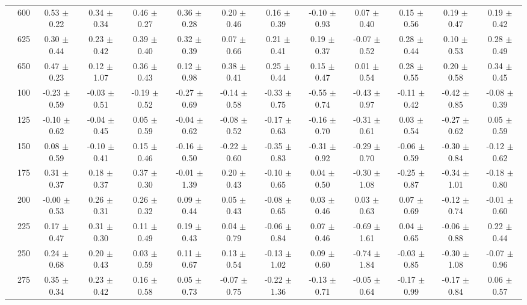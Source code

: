\begin{table}[h]
{\begin{tabular}{
        ccccccccccccc}
 & 600& 0.53 $\pm$ 0.22& 0.34 $\pm$ 0.34& 0.46 $\pm$ 0.27& 0.36 $\pm$ 0.28& 0.20 $\pm$ 0.46& 0.16 $\pm$ 0.39& -0.10 $\pm$ 0.93& 0.07 $\pm$ 0.40& 0.15 $\pm$ 0.56& 0.19 $\pm$ 0.47& 0.19 $\pm$ 0.42 \\ 
 & 625& 0.30 $\pm$ 0.44& 0.23 $\pm$ 0.42& 0.39 $\pm$ 0.40& 0.32 $\pm$ 0.39& 0.07 $\pm$ 0.66& 0.21 $\pm$ 0.41& 0.19 $\pm$ 0.37& -0.07 $\pm$ 0.52& 0.28 $\pm$ 0.44& 0.10 $\pm$ 0.53& 0.28 $\pm$ 0.49 \\ 
 & 650& 0.47 $\pm$ 0.23& 0.12 $\pm$ 1.07& 0.36 $\pm$ 0.43& 0.12 $\pm$ 0.98& 0.38 $\pm$ 0.41& 0.25 $\pm$ 0.44& 0.15 $\pm$ 0.47& 0.01 $\pm$ 0.54& 0.28 $\pm$ 0.55& 0.20 $\pm$ 0.58& 0.34 $\pm$ 0.45 \\ \hline 
 & 100& -0.23 $\pm$ 0.59& -0.03 $\pm$ 0.51& -0.19 $\pm$ 0.52& -0.27 $\pm$ 0.69& -0.14 $\pm$ 0.58& -0.33 $\pm$ 0.75& -0.55 $\pm$ 0.74& -0.43 $\pm$ 0.97& -0.11 $\pm$ 0.42& -0.42 $\pm$ 0.85& -0.08 $\pm$ 0.39 \\ 
 & 125& -0.10 $\pm$ 0.62& -0.04 $\pm$ 0.45& 0.05 $\pm$ 0.59& -0.04 $\pm$ 0.62& -0.08 $\pm$ 0.52& -0.17 $\pm$ 0.63& -0.16 $\pm$ 0.70& -0.31 $\pm$ 0.61& 0.03 $\pm$ 0.54& -0.27 $\pm$ 0.62& 0.05 $\pm$ 0.59 \\ 
 & 150& 0.08 $\pm$ 0.59& -0.10 $\pm$ 0.41& 0.15 $\pm$ 0.46& -0.16 $\pm$ 0.50& -0.22 $\pm$ 0.60& -0.35 $\pm$ 0.83& -0.31 $\pm$ 0.92& -0.29 $\pm$ 0.70& -0.06 $\pm$ 0.59& -0.30 $\pm$ 0.84& -0.12 $\pm$ 0.62 \\ 
 & 175& 0.31 $\pm$ 0.37& 0.18 $\pm$ 0.37& 0.37 $\pm$ 0.30& -0.01 $\pm$ 1.39& 0.20 $\pm$ 0.43& -0.10 $\pm$ 0.65& 0.04 $\pm$ 0.50& -0.30 $\pm$ 1.08& -0.25 $\pm$ 0.87& -0.34 $\pm$ 1.01& -0.18 $\pm$ 0.80 \\ 
 & 200& -0.00 $\pm$ 0.53& 0.26 $\pm$ 0.31& 0.26 $\pm$ 0.32& 0.09 $\pm$ 0.44& 0.05 $\pm$ 0.43& -0.08 $\pm$ 0.65& 0.03 $\pm$ 0.46& 0.03 $\pm$ 0.63& 0.07 $\pm$ 0.69& -0.12 $\pm$ 0.74& -0.01 $\pm$ 0.60 \\ 
 & 225& 0.17 $\pm$ 0.47& 0.31 $\pm$ 0.30& 0.11 $\pm$ 0.49& 0.19 $\pm$ 0.43& 0.04 $\pm$ 0.79& -0.06 $\pm$ 0.84& 0.07 $\pm$ 0.46& -0.69 $\pm$ 1.61& 0.04 $\pm$ 0.65& -0.06 $\pm$ 0.88& 0.22 $\pm$ 0.44 \\ 
 & 250& 0.24 $\pm$ 0.68& 0.20 $\pm$ 0.43& 0.03 $\pm$ 0.59& 0.11 $\pm$ 0.67& 0.13 $\pm$ 0.54& -0.13 $\pm$ 1.02& 0.09 $\pm$ 0.60& -0.74 $\pm$ 1.84& -0.03 $\pm$ 0.85& -0.30 $\pm$ 1.08& -0.07 $\pm$ 0.96 \\ 
 & 275& 0.35 $\pm$ 0.34& 0.23 $\pm$ 0.42& 0.16 $\pm$ 0.58& 0.05 $\pm$ 0.73& -0.07 $\pm$ 0.75& -0.22 $\pm$ 1.36& -0.13 $\pm$ 0.71& -0.05 $\pm$ 0.64& -0.17 $\pm$ 0.99& -0.17 $\pm$ 0.84& 0.06 $\pm$ 0.57 \\ 

\end{tabular}}
\end{table}

